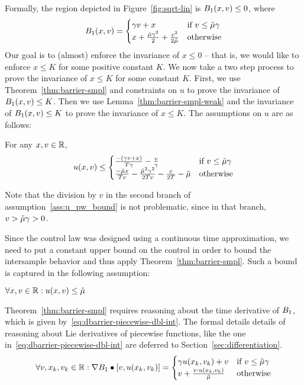 Formally, the region depicted in Figure~\ref{fig:sqrt-lin} is $B_1 (x,v)
\leq 0$, where
\begin{equation}
B_1 (x,v) =
\begin{cases}
\gamma v + x & \text{if } v \leq \tilde{\mu}\gamma \\
x + \frac{\tilde{\mu} \gamma^2}{2} + \frac{v^2}{2\tilde{\mu}} & \text{otherwise}
\end{cases}
\label{eq:barrier-piecewise-dbl-int}
\end{equation}
Our goal is to (almost) enforce the invariance of $x \leq 0$ -- that is, we
would like to enforce $x \leq K$ for some positive constant $K$.  We now
take a two step process to prove the invariance of $x \leq K$ for some
constant $K$. First, we use Theorem~\ref{thm:barrier-smpl} and constraints
on $u$ to prove the invariance of $B_1 (x,v) \leq K$. Then we use
Lemma~\ref{thm:barrier-smpl-weak} and the invariance of $B_1 (x,v) \leq K$
to prove the invariance of $x \leq K$. The assumptions on $u$ are as
follows:
\begin{assumption}
For any $x,v \in \mathbb{R}$,
\[
u(x,v) \leq
\begin{cases}
\frac{-(\gamma v + x)}{T\gamma} - \frac{v}{\gamma} & \text{if } v \leq \tilde{\mu}\gamma \\
\frac{-\tilde{\mu} x}{T v} - \frac{\tilde{\mu}^2 \gamma^2}{2Tv} - \frac{v}{2T} - \tilde{\mu} & \text{otherwise}
\end{cases}
\]
\label{ass:u_pw_bound}
\end{assumption}

Note that the division by $v$ in the second branch of
assumption~\ref{ass:u_pw_bound} is not problematic, since in that branch,
$v > \tilde{\mu}\gamma > 0$.

Since the control law was designed using a continuous time approximation,
we need to put a constant upper bound on the control in order to bound the
intersample behavior and thus apply Theorem~\ref{thm:barrier-smpl}. Such a
bound is captured in the following assumption:
\begin{assumption}
$\forall x, v \in \mathbb{R} : u(x,v) \leq \tilde{\mu}$
\label{ass:u_umax_bound}
\end{assumption}

Theorem~\ref{thm:barrier-smpl} requires reasoning about the time derivative
of $B_1$, which is given by~\eqref{eq:dbarrier-piecewise-dbl-int}. The
formal details details of reasoning about Lie derivatives of piecewise
functions, like the one in~\eqref{eq:dbarrier-piecewise-dbl-int} are
deferred to Section~\ref{sec:differentiation}.
\begin{equation}
\forall v, x_k, v_k \in \mathbb{R} : \nabla B_1 \bullet [v,u(x_k,v_k)] =
\begin{cases}
\gamma u(x_k,v_k) + v & \text{if } v \leq \tilde{\mu}\gamma \\
v + \frac{v\cdot u(x_k,v_k)}{\tilde{\mu}} & \text{otherwise}
\end{cases}
\label{eq:dbarrier-piecewise-dbl-int}
\end{equation}

